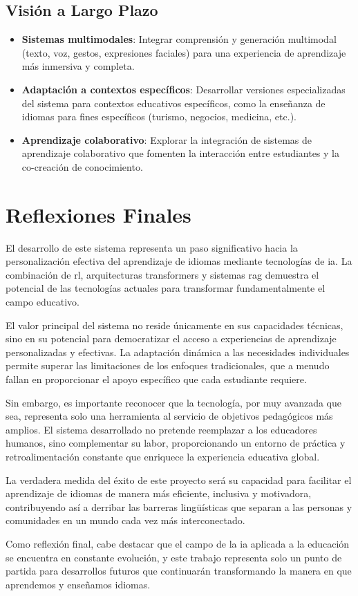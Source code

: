 \subsection{Visión a Largo Plazo}
\label{subsec:vision-largo-plazo}

\begin{itemize}
    \item \textbf{Sistemas multimodales}: Integrar comprensión y generación multimodal (texto, voz, gestos, expresiones faciales) para una experiencia de aprendizaje más inmersiva y completa.
    
    \item \textbf{Adaptación a contextos específicos}: Desarrollar versiones especializadas del sistema para contextos educativos específicos, como la enseñanza de idiomas para fines específicos (turismo, negocios, medicina, etc.).
    
    \item \textbf{Aprendizaje colaborativo}: Explorar la integración de sistemas de aprendizaje colaborativo que fomenten la interacción entre estudiantes y la co-creación de conocimiento.
\end{itemize}

\section{Reflexiones Finales}
\label{sec:reflexiones-finales}

El desarrollo de este sistema representa un paso significativo hacia la personalización efectiva del aprendizaje de idiomas mediante tecnologías de \gls{ia}. La combinación de \gls{rl}, arquitecturas \gls{transformers} y sistemas \gls{rag} demuestra el potencial de las tecnologías actuales para transformar fundamentalmente el campo educativo.

El valor principal del sistema no reside únicamente en sus capacidades técnicas, sino en su potencial para democratizar el acceso a experiencias de aprendizaje personalizadas y efectivas. La adaptación dinámica a las necesidades individuales permite superar las limitaciones de los enfoques tradicionales, que a menudo fallan en proporcionar el apoyo específico que cada estudiante requiere.

Sin embargo, es importante reconocer que la tecnología, por muy avanzada que sea, representa solo una herramienta al servicio de objetivos pedagógicos más amplios. El sistema desarrollado no pretende reemplazar a los educadores humanos, sino complementar su labor, proporcionando un entorno de práctica y retroalimentación constante que enriquece la experiencia educativa global.

La verdadera medida del éxito de este proyecto será su capacidad para facilitar el aprendizaje de idiomas de manera más eficiente, inclusiva y motivadora, contribuyendo así a derribar las barreras lingüísticas que separan a las personas y comunidades en un mundo cada vez más interconectado.

Como reflexión final, cabe destacar que el campo de la \gls{ia} aplicada a la educación se encuentra en constante evolución, y este trabajo representa solo un punto de partida para desarrollos futuros que continuarán transformando la manera en que aprendemos y enseñamos idiomas.